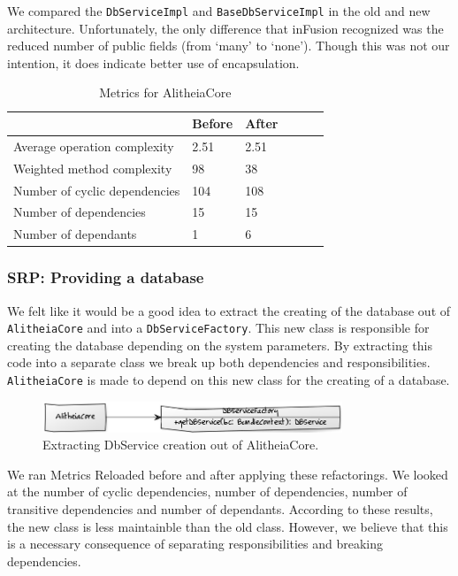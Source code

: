 \documentclass{article}
\begin{document}
We compared the \verb|DbServiceImpl| and \verb|BaseDbServiceImpl| in the old and new architecture. Unfortunately, the only difference that inFusion recognized was the reduced number of public fields (from `many' to `none'). Though this was not our intention, it does indicate better use of encapsulation.


\begin{table}
	\centering
    \begin{tabular}{l|llll}
    ~                                 & Before & After & ~ & ~ \\ \hline
    Average operation complexity      & 2.51 & 2.51 \\
    Weighted method complexity        & 98   & 38 \\
    Number of cyclic dependencies     & 104  & 108 \\
    Number of dependencies            & 15   & 15  \\
    Number of dependants              & 1    & 6   \\
    \end{tabular}
    \caption{Metrics for AlitheiaCore}
\end{table}

\subsubsection{SRP: Providing a database}
We felt like it would be a good idea to extract the creating of the database out of \verb|AlitheiaCore| and into a \verb|DbServiceFactory|. This new class is responsible for creating the database depending on the system parameters. By extracting this code into a separate class we break up both dependencies and responsibilities. \verb|AlitheiaCore| is made to depend on this new class for the creating of a database.

\begin{figure}[h]
    \centering
    \includegraphics[width=0.8\textwidth]{dbfactory}
    \caption{Extracting DbService creation out of AlitheiaCore.}
    \label{fig:dbfactory}
\end{figure}

We ran Metrics Reloaded before and after applying these refactorings. We looked at the number of cyclic dependencies, number of dependencies, number of transitive dependencies and number of dependants. According to these results, the new class is less maintainble than the old class. However, we believe that this is a necessary consequence of separating responsibilities and breaking dependencies.
\end{document}
